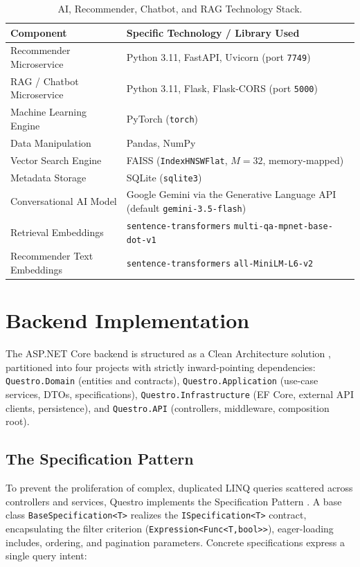 \begin{table}[H]
    \centering
    \caption{AI, Recommender, Chatbot, and RAG Technology Stack.}
    \label{tab:chatbot_tech_detailed}
    \begin{tabular}{|l|p{8cm}|}
        \hline
        \textbf{Component} & \textbf{Specific Technology / Library Used} \\ \hline
        Recommender Microservice & Python 3.11, FastAPI, Uvicorn (port \texttt{7749}) \\ \hline
        RAG / Chatbot Microservice & Python 3.11, Flask, Flask-CORS (port \texttt{5000}) \\ \hline
        Machine Learning Engine & PyTorch (\texttt{torch}) \cite{paszke2019pytorch} \\ \hline
        Data Manipulation & Pandas, NumPy \\ \hline
        Vector Search Engine & FAISS (\texttt{IndexHNSWFlat}, $M{=}32$, memory-mapped) \cite{johnson2019billion} \\ \hline
        Metadata Storage & SQLite (\texttt{sqlite3}) \\ \hline
        Conversational AI Model & Google Gemini via the Generative Language API (default \texttt{gemini-3.5-flash}) \cite{gemini_ref} \\ \hline
        Retrieval Embeddings & \texttt{sentence-transformers} \texttt{multi-qa-mpnet-base-dot-v1} \cite{reimers2019sentencebert} \\ \hline
        Recommender Text Embeddings & \texttt{sentence-transformers} \texttt{all-MiniLM-L6-v2} \cite{wang2020minilm} \\ \hline
    \end{tabular}
\end{table}

\section{Backend Implementation}
The ASP.NET Core backend is structured as a Clean Architecture solution \cite{martin2017clean}, partitioned into four projects with strictly inward-pointing dependencies: \texttt{Questro.Domain} (entities and contracts), \texttt{Questro.Application} (use-case services, DTOs, specifications), \texttt{Questro.Infrastructure} (EF Core, external API clients, persistence), and \texttt{Questro.API} (controllers, middleware, composition root).

\subsection{The Specification Pattern}
To prevent the proliferation of complex, duplicated LINQ queries scattered across controllers and services, Questro implements the Specification Pattern \cite{evans2003ddd, fowler2002patterns}. A base class \texttt{BaseSpecification<T>} realizes the \texttt{ISpecification<T>} contract, encapsulating the filter criterion (\texttt{Expression<Func<T,bool>>}), eager-loading includes, ordering, and pagination parameters. Concrete specifications express a single query intent:

